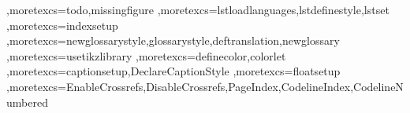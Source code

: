 {   %
   ,moretexcs={todo,missingfigure}
   ,moretexcs={lstloadlanguages,lstdefinestyle,lstset}
   ,moretexcs={indexsetup}
   ,moretexcs={newglossarystyle,glossarystyle,deftranslation,newglossary}
   ,moretexcs={usetikzlibrary}
   ,moretexcs={definecolor,colorlet}
   ,moretexcs={captionsetup,DeclareCaptionStyle}
   ,moretexcs={floatsetup}
   ,moretexcs={EnableCrossrefs,DisableCrossrefs,PageIndex,CodelineIndex,CodelineNumbered}   
}
% 

